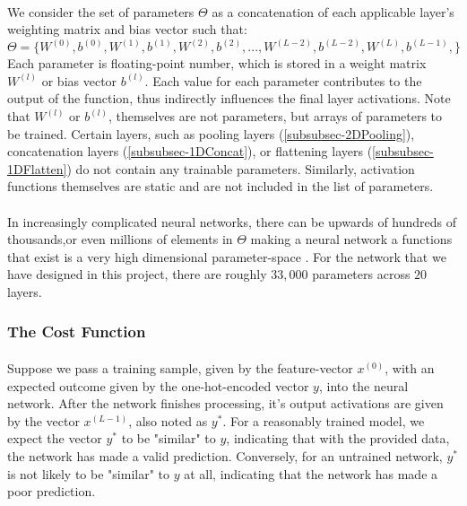 \documentclass[12pt,letterpaper]{article}
\begin{document}
\paragraph*{}We consider the set of parameters $\Theta$ as a concatenation of each applicable layer's weighting matrix and bias vector such that:
\begin{equation}
\label{eqn-Theta}
\Theta = \big\{
W^{(0)}, b^{(0)}, W^{(1)}, b^{(1)}, W^{(2)}, b^{(2)}, ... ,W^{(L-2)}, b^{(L-2)}, W^{(L)}, b^{(L-1)},
\big\}
\end{equation}
Each parameter is floating-point number, which is stored in a weight matrix $W^{(l)}$ or bias vector $b^{(l)}$. Each value for each parameter contributes to the output of the function, thus indirectly influences the final layer activations. Note that $W^{(l)}$ or $b^{(l)}$, themselves are not parameters, but arrays of parameters to be trained. Certain layers, such as pooling layers (\ref{subsubsec-2DPooling}), concatenation layers (\ref{subsubsec-1DConcat}), or flattening layers (\ref{subsubsec-1DFlatten}) do not contain any trainable parameters. Similarly, activation functions themselves are static and are not included in the list of parameters.

\paragraph*{}In increasingly complicated neural networks, there can be upwards of hundreds of thousands,or even millions of elements in $\Theta$ making a neural network a functions that exist is a very high dimensional parameter-space \cite{Geron,Goodfellow,Levine}. For the network that we have designed in this project, there are roughly $33,000$ parameters across $20$ layers.

\subsubsection{The Cost Function}

\paragraph*{}Suppose we pass a training sample, given by the feature-vector $x^{(0)}$, with an expected outcome given by the one-hot-encoded vector $y$, into the neural network. After the network finishes processing, it's output activations are given by the vector $x^{(L-1)}$, also noted as $y^*$. For a reasonably trained model, we expect the vector $y^*$ to be "similar" to $y$, indicating that with the provided data, the network has made a valid prediction. Conversely, for an untrained network, $y^*$ is not likely to be "similar" to $y$ at all, indicating that the network has made a poor prediction. 
\end{document}
